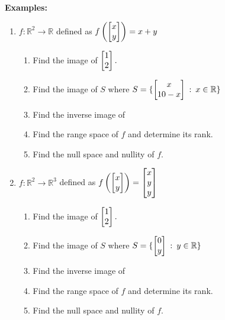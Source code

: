 \documentclass[11pt,fleqn]{article}
\begin{document}
\newpage
\textbf{Examples:}
	\begin{enumerate}
	\item $f: \mathbb{R}^2 \to \mathbb{R}$ defined as $f\left(\begin{bmatrix} x \\y \end{bmatrix}\right)= x+y$
	\begin{enumerate}
	\item Find the image of $\begin{bmatrix} 1\\2 \end{bmatrix}.$\\
	
	\item Find the image of $S$ where $S=\{ \begin{bmatrix} x\\10-x \end{bmatrix} \: : \: x \in \mathbb{R}\}$
	\vfill
	\item Find the inverse image of 
	\vfill
	\item Find the range space of $f$ and determine its rank.
	\vfill
	\item Find the null space and nullity of $f.$
	\vfill
	\end{enumerate}
\newpage
	\item $f: \mathbb{R}^2 \to \mathbb{R}^3$ defined as $f\left(\begin{bmatrix} x \\y \end{bmatrix}\right)=\begin{bmatrix} x\\y\\y \end{bmatrix}$
	\begin{enumerate}
	\item Find the image of $\begin{bmatrix} 1\\2 \end{bmatrix}.$\\
	
	\item Find the image of $S$ where $S=\{ \begin{bmatrix} 0\\y \end{bmatrix} \: : \: y \in \mathbb{R}\}$
	\vfill
	\item Find the inverse image of 
	\vfill
	\item Find the range space of $f$ and determine its rank.
	\vfill
	\item Find the null space and nullity of $f.$
	\vfill
	\end{enumerate}
	\end{enumerate}
\end{document}
